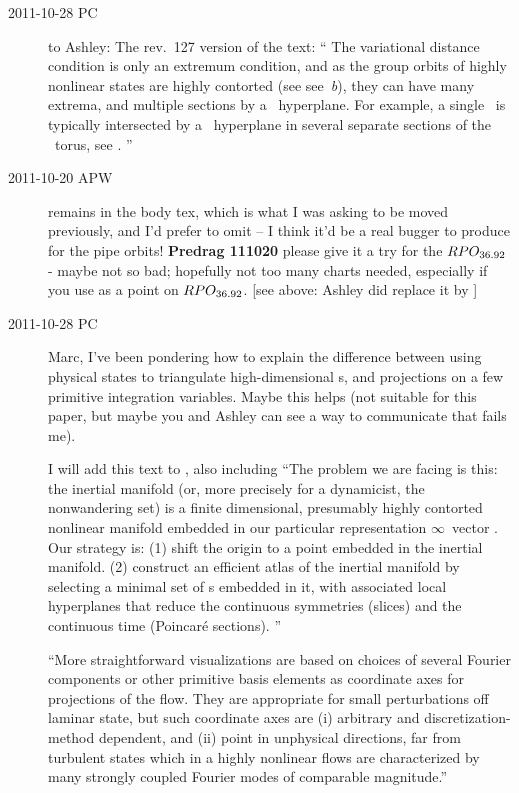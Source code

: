 \begin{description}
\item[2011-10-28 PC~~] to Ashley:
The rev.~127 version of the text: ``
The variational distance condition  is
only an extremum condition, and as the group orbits of highly nonlinear
states are highly contorted (see see \,{\it b}), they can
have many extrema, and multiple sections by a \slice\ hyperplane. For
example, a single \rpo\ is typically intersected by a \slice\ hyperplane
in several separate sections of the \rpo\ torus, see
.
''


\item[2011-10-20 APW~~]
 remains in the body tex,
which is what I was asking to be moved previously, and I'd prefer to omit
-- I think it'd be a real bugger to produce for the pipe orbits!
{\bf Predrag 111020} please give it a try for the $RPO_{36.92}$ - maybe
not so bad; hopefully not too many charts needed, especially if you use
as {\template} a point on $RPO_{36.92}$.
[see above: Ashley did replace it by ]


\item[2011-10-28 PC~~] Marc, I've been pondering how to explain the
difference between using physical states to triangulate high-dimensional
\statesp s, and projections on a few primitive integration variables.
Maybe this helps (not suitable for this paper, but maybe you and Ashley
can see a way to communicate that fails me).

I will add this text to , also including
    ``The problem we are facing is this: the inertial manifold
(or, more precisely for a dynamicist, the nonwandering set) is a
finite dimensional, presumably highly contorted nonlinear manifold
\citep{foias88}
embedded in our particular representation $\infty$\dmn\ vector \statesp.
Our strategy is: (1) shift the origin to a point embedded in the
inertial manifold. (2) construct an efficient atlas of the inertial manifold
by selecting a minimal set of \template s embedded in it, with associated
local hyperplanes that reduce the continuous symmetries (slices) and the
continuous time (Poincar\'e sections).
''

    ``More straightforward visualizations are based on choices of several Fourier
components  or other primitive basis elements as
coordinate axes for projections of the flow. They are appropriate for
small perturbations off laminar state, but such coordinate axes are (i)
arbitrary and discretization-method dependent, and (ii) point in
unphysical directions, far from turbulent states which in a highly
nonlinear flows are characterized by  many strongly coupled Fourier modes
of comparable magnitude.''


\end{description}
